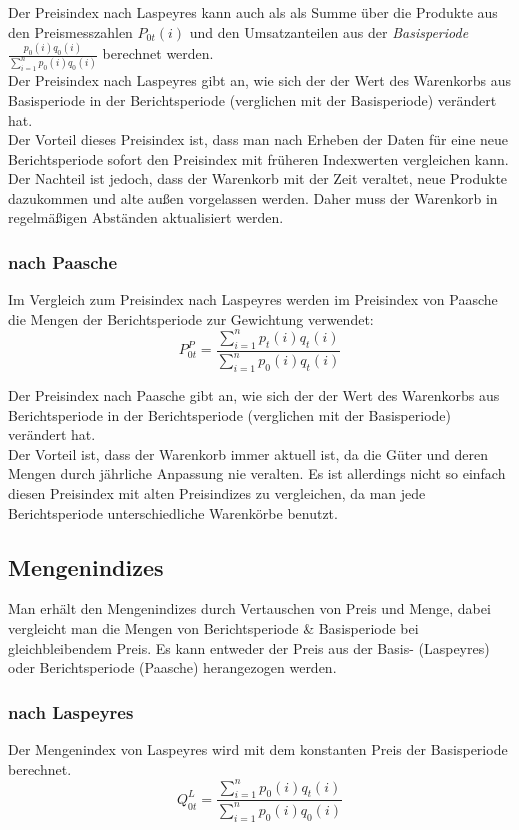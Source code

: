 \documentclass[a4paper]{article}
\newcommand\dangersign[1][2ex]{%
  \renewcommand\stacktype{L}%
  \scaleto{\stackon[1.3pt]{\color{red}$\triangle$}{\tiny !}}{#1}%
}
\begin{document}
\noindent \dangersign[3ex] Der Preisindex nach Laspeyres kann auch als als Summe über die Produkte aus den Preismesszahlen $P_{0t}(i)$ und den Umsatzanteilen aus der \textit{Basisperiode} $\frac{p_0(i)q_0(i)}{\sum_{i=1}^n p_0(i)q_0(i)}$ berechnet werden. \\

\noindent Der Preisindex nach Laspeyres gibt an, wie sich der der Wert des Warenkorbs aus Basisperiode in der Berichtsperiode (verglichen mit der Basisperiode) verändert hat.\\
Der Vorteil dieses Preisindex ist, dass man nach Erheben der Daten für eine neue Berichtsperiode sofort den Preisindex mit früheren Indexwerten vergleichen kann. Der Nachteil ist jedoch, dass der Warenkorb mit der Zeit veraltet, neue Produkte dazukommen und alte außen vorgelassen werden. Daher muss der Warenkorb in regelmäßigen Abständen aktualisiert werden.

\subsubsection{nach Paasche}\label{sec:p-paasche}
Im Vergleich zum Preisindex nach Laspeyres werden im Preisindex von Paasche die Mengen der Berichtsperiode zur Gewichtung verwendet:
$$P_{0t}^P =\frac{\sum_{i=1}^n p_t(i)q_t(i)}{\sum_{i=1}^n p_0(i)q_t(i)}$$

\noindent Der Preisindex nach Paasche gibt an, wie sich der der Wert des Warenkorbs aus Berichtsperiode in der Berichtsperiode (verglichen mit der Basisperiode) verändert hat.\\
Der Vorteil ist, dass der Warenkorb immer aktuell ist, da die Güter und deren Mengen durch jährliche Anpassung nie veralten. Es ist allerdings nicht so einfach diesen Preisindex mit alten Preisindizes zu vergleichen, da man jede Berichtsperiode unterschiedliche Warenkörbe benutzt.

\subsection{Mengenindizes}\label{sec:menge}
Man erhält den Mengenindizes durch Vertauschen von Preis und Menge, dabei vergleicht man die Mengen von Berichtsperiode \& Basisperiode bei gleichbleibendem Preis. Es kann entweder der Preis aus der Basis- (Laspeyres) oder Berichtsperiode (Paasche) herangezogen werden.

\subsubsection{nach Laspeyres}\label{sec:q-laspeyres}
Der Mengenindex von Laspeyres wird mit dem konstanten Preis der Basisperiode berechnet.
$$Q_{0t}^L = \frac{\sum_{i=1}^n p_0(i)q_t(i)}{\sum_{i=1}^n p_0(i)q_0(i)}$$
\end{document}
